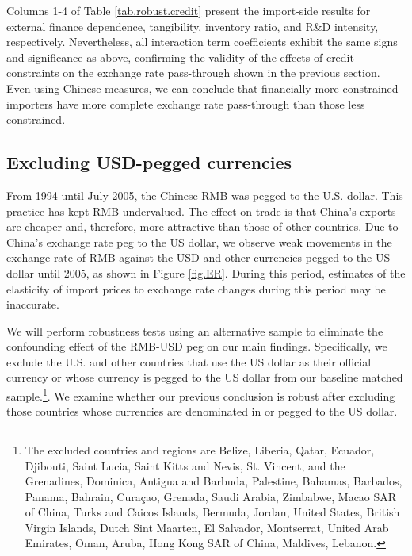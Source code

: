 \documentclass[12pt]{article}
\begin{document}
Columns 1-4 of Table \ref{tab.robust.credit} present the import-side results for external finance dependence, tangibility, inventory ratio, and R\&D intensity, respectively. Nevertheless, all interaction term coefficients exhibit the same signs and significance as above, confirming the validity of the effects of credit constraints on the exchange rate pass-through shown in the previous section. Even using Chinese measures, we can conclude that financially more constrained importers have more complete exchange rate pass-through than those less constrained.

\subsection{Excluding USD-pegged currencies}

From 1994 until July 2005, the Chinese RMB was pegged to the U.S. dollar. This practice has kept RMB undervalued. The effect on trade is that China's exports are cheaper and, therefore, more attractive than those of other countries. Due to China's exchange rate peg to the US dollar, we observe weak movements in the exchange rate of RMB against the USD and other currencies pegged to the US dollar until 2005, as shown in Figure \ref{fig.ER}. During this period, estimates of the elasticity of import prices to exchange rate changes during this period may be inaccurate.

We will perform robustness tests using an alternative sample to eliminate the confounding effect of the RMB-USD peg on our main findings. Specifically, we exclude the U.S. and other countries that use the US dollar as their official currency or whose currency is pegged to the US dollar from our baseline matched sample.\footnote{The excluded countries and regions are Belize, Liberia, Qatar, Ecuador, Djibouti, Saint Lucia, Saint Kitts and Nevis, St. Vincent, and the Grenadines, Dominica, Antigua and Barbuda, Palestine, Bahamas, Barbados, Panama, Bahrain, Curaçao, Grenada, Saudi Arabia, Zimbabwe, Macao SAR of China, Turks and Caicos Islands, Bermuda, Jordan, United States, British Virgin Islands, Dutch Sint Maarten, El Salvador, Montserrat, United Arab Emirates, Oman, Aruba, Hong Kong SAR of China, Maldives, Lebanon.}. We examine whether our previous conclusion is robust after excluding those countries whose currencies are denominated in or pegged to the US dollar.
\end{document}
